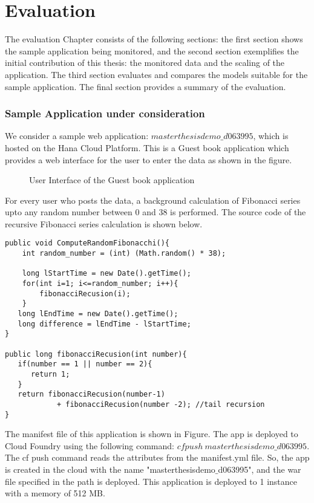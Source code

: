 \documentclass[article,type=msc,colorback,12pt,accentcolor=tud7b]{tudthesis}
\begin{document}
 \cleardoublepage
 \section{Evaluation}
 
 The evaluation Chapter consists of the following sections: the first section shows the sample application being monitored, and the second section exemplifies the initial contribution of this thesis: the monitored data and the scaling of the application. The third section evaluates and compares the models suitable for the sample application. The final section provides a summary of the evaluation. 

	\subsubsection{Sample Application under consideration}
We consider a sample web application: $masterthesisdemo\_d063995$, which is hosted on the Hana Cloud Platform. This is a Guest book application which provides a web interface for the user to enter the data as shown in the figure. 
 \begin{figure}[h]
 \begin{center}
  \makebox[\textwidth]{\texttt{[image: E1]}}
\end{center}
\caption{User Interface of the Guest book application}
\end{figure}
For every user who posts the data, a background calculation of Fibonacci series upto any random number between 0 and 38 is performed. The source code of the recursive Fibonacci series calculation is shown below.
 \begin{lstlisting}
public void ComputeRandomFibonacchi(){		
	int random_number = (int) (Math.random() * 38);		
		
	long lStartTime = new Date().getTime();
	for(int i=1; i<=random_number; i++){
		fibonacciRecusion(i);
    }			
   long lEndTime = new Date().getTime();
   long difference = lEndTime - lStartTime;    	
}
		  
public long fibonacciRecusion(int number){
   if(number == 1 || number == 2){
      return 1;
   }
   return fibonacciRecusion(number-1) 
   			+ fibonacciRecusion(number -2); //tail recursion
}
\end{lstlisting}

The manifest file of this application is shown in Figure. The app is deployed to Cloud Foundry using the following command: $ cf push \: masterthesisdemo\_d063995 $. The cf push command reads the attributes from the manifest.yml file. So, the app is created in the cloud with the name "masterthesisdemo$\_$d063995", and the war file specified in the path is deployed. This application is deployed to 1 instance with a memory of 512 MB.
\end{document}
